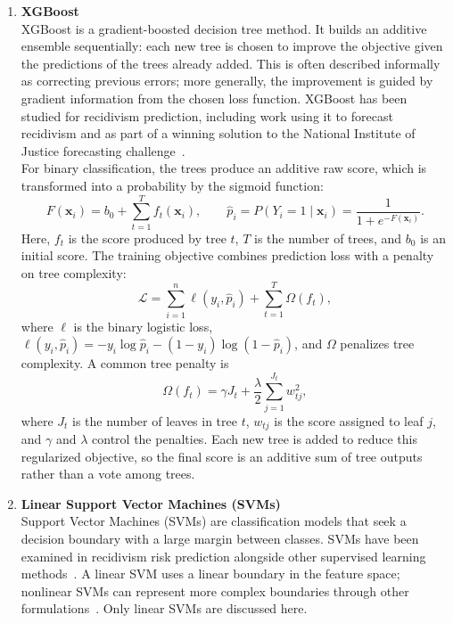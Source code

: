 \documentclass[12pt]{article}
\begin{document}
\begin{enumerate}
 \item \textbf{XGBoost}\\
  \tabto{2em} XGBoost is a gradient-boosted decision tree method. It builds an additive ensemble sequentially: each new tree is chosen to improve the objective given the predictions of the trees already added. This is often described informally as correcting previous errors; more generally, the improvement is guided by gradient information from the chosen loss function. XGBoost has been studied for recidivism prediction, including work using it to forecast recidivism and as part of a winning solution to the National Institute of Justice forecasting challenge~\cite{won2019recidivism,rajendran2021predicting,han2022xgboost}.\\
  
  For binary classification, the trees produce an additive raw score, which is transformed into a probability by the sigmoid function:
  \[
  F(\mathbf{x}_i)=b_0+\sum_{t=1}^{T}f_t(\mathbf{x}_i),
  \qquad
  \hat{p}_i=P(Y_i=1\mid\mathbf{x}_i)=\frac{1}{1+e^{-F(\mathbf{x}_i)}}.
  \]
  Here, $f_t$ is the score produced by tree $t$, $T$ is the number of trees, and $b_0$ is an initial score. The training objective combines prediction loss with a penalty on tree complexity:
  \[
  \mathcal{L}=\sum_{i=1}^{n}\ell(y_i,\hat{p}_i)+\sum_{t=1}^{T}\Omega(f_t),
  \]
  where $\ell$ is the binary logistic loss, $\ell(y_i,\hat{p}_i)=-y_i\log\hat{p}_i-(1-y_i)\log(1-\hat{p}_i)$, and $\Omega$ penalizes tree complexity. A common tree penalty is
  \[
  \Omega(f_t)=\gamma J_t+\frac{\lambda}{2}\sum_{j=1}^{J_t}w_{tj}^{2},
  \]
  where $J_t$ is the number of leaves in tree $t$, $w_{tj}$ is the score assigned to leaf $j$, and $\gamma$ and $\lambda$ control the penalties. Each new tree is added to reduce this regularized objective, so the final score is an additive sum of tree outputs rather than a vote among trees.\\

 \item \textbf{Linear Support Vector Machines (SVMs)}\\
  \tabto{2em} Support Vector Machines (SVMs) are classification models that seek a decision boundary with a large margin between classes. SVMs have been examined in recidivism risk prediction alongside other supervised learning methods~\cite{duwe2017out,tolan2019machine,ozkan2017predicting}. A linear SVM uses a linear boundary in the feature space; nonlinear SVMs can represent more complex boundaries through other formulations~\cite{tollenaar2013method,duwe2017out,dressel2018accuracy}. Only linear SVMs are discussed here.\\


\end{enumerate}
\end{document}
